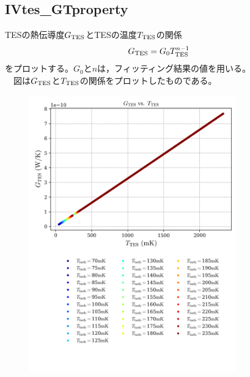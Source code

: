 \documentclass[platex,dvipdfmx,10pt,twoside,a4paper,jis2004]{jsarticle}
\begin{document}
\subsection*{IVtes\_GTproperty}
TESの熱伝導度$G_{\rm TES }$とTESの温度$T_{\rm TES}$の関係
\[
G_{\rm TES} = G_0T_{\rm TES}^{n-1}
\]
をプロットする。$G_0$と$n$は，フィッティング結果の値を用いる。
\\　図は$G_{\rm TES }$と$T_{\rm TES}$の関係をプロットしたものである。
\begin{figure}[H]
    \centering
    \includegraphics[width=0.8\textwidth]{IVtes_GTproperty.png}
    \label{fig:IVtesGTproperty}
\end{figure}
\clearpage
\end{document}
